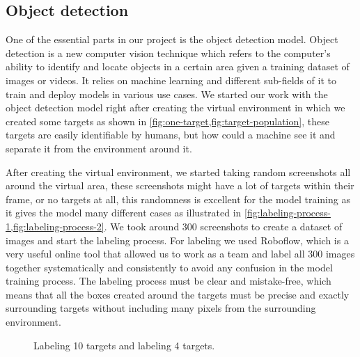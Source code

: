 \documentclass[../main.tex]{subfiles}
\begin{document}
\subsection{Object detection}\label{sec:obj-detection}
%
%
One of the essential parts in our project is the object
detection model. Object detection is a new computer vision
technique which refers to the computer's ability to 
identify and locate objects in a certain area given a training dataset 
of images or videos. It relies on machine learning and different 
sub-fields of it to train and deploy models in various use cases. 
We started our work with the object detection model right 
after creating the virtual environment in which we created
some targets as shown in \cref{fig:one-target,fig:target-population}, these 
targets are easily identifiable by humans, but how could a
machine see it and separate it from the environment around it.
 
After creating the virtual environment, we started taking random 
screenshots all around the virtual area, these screenshots 
might have a lot of targets within their frame, or no targets at all, 
this randomness is excellent for the model training as it gives the 
model many different cases as illustrated in 
\cref{fig:labeling-process-1,fig:labeling-process-2}.
We took around 300 screenshots to create a dataset of images and
start the labeling process. For labeling we used Roboflow, which is a 
very useful online tool that allowed us to work as a team and label all
300 images together systematically and consistently to avoid any 
confusion in the model training process. The labeling process must be 
clear and mistake-free, which means that all the boxes created around 
the targets must be precise and exactly surrounding targets without 
including many pixels from the surrounding environment.

\begin{figure}[tbp]%
	\centering
	\hspace{0.5cm}
	\caption{%
		\protect{} 
		Labeling 10 targets and
		\protect{} 
		labeling 4 targets.}%
	\label{fig:labeling-targets}%
\end{figure}
\end{document}
